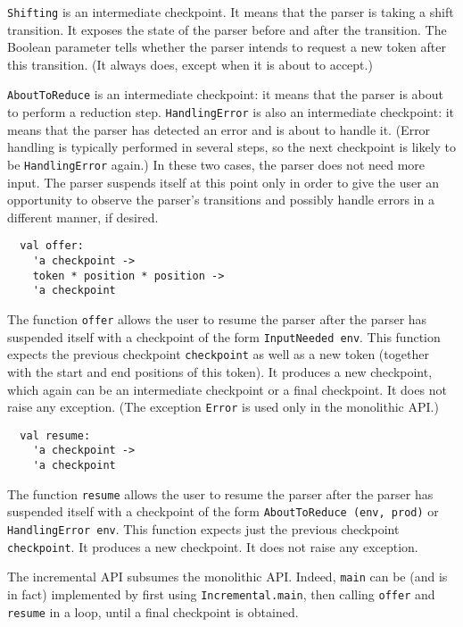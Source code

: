 \documentclass[onecolumn,11pt,nocopyrightspace,preprint]{sigplanconf}
\begin{document}
\verb+Shifting+ is an intermediate checkpoint. It means that the parser is taking
a shift transition. It exposes the state of the parser before and after the
transition. The Boolean parameter tells whether the parser intends to request
a new token after this transition. (It always does, except when it is about to
accept.)

\verb+AboutToReduce+ is an intermediate checkpoint: it means that the parser is
about to perform a reduction step. \verb+HandlingError+ is also an
intermediate checkpoint: it means that the parser has detected an error and is
about to handle it. (Error handling is typically performed in several steps,
so the next checkpoint is likely to be \verb+HandlingError+ again.) In these two
cases, the parser does not need more input. The parser suspends itself at this
point only in order to give the user an opportunity to observe the parser's
transitions and possibly handle errors in a different manner, if desired.


\begin{verbatim}
  val offer:
    'a checkpoint ->
    token * position * position ->
    'a checkpoint
\end{verbatim}

The function \verb+offer+ allows the user to resume the parser after the
parser has suspended itself with a checkpoint of the form \verb+InputNeeded env+.
This function expects the previous checkpoint \verb+checkpoint+ as well as a new token
(together with the start and end positions of this token). It produces a new
checkpoint, which again can be an intermediate checkpoint or a final checkpoint. It does
not raise any exception. (The exception \texttt{Error} is used only in the
monolithic API.)


\begin{verbatim}
  val resume:
    'a checkpoint ->
    'a checkpoint
\end{verbatim}

The function \verb+resume+ allows the user to resume the parser after the
parser has suspended itself with a checkpoint of the form
\verb+AboutToReduce (env, prod)+ or \verb+HandlingError env+.
This function expects just the previous checkpoint \verb+checkpoint+. It produces a new
checkpoint. It does not raise any exception.

The incremental API subsumes the monolithic API. Indeed, \verb+main+ can be
(and is in fact) implemented by first using
\verb+Incremental.main+, then calling \verb+offer+ and
\verb+resume+ in a loop, until a final checkpoint is obtained.
\end{document}
